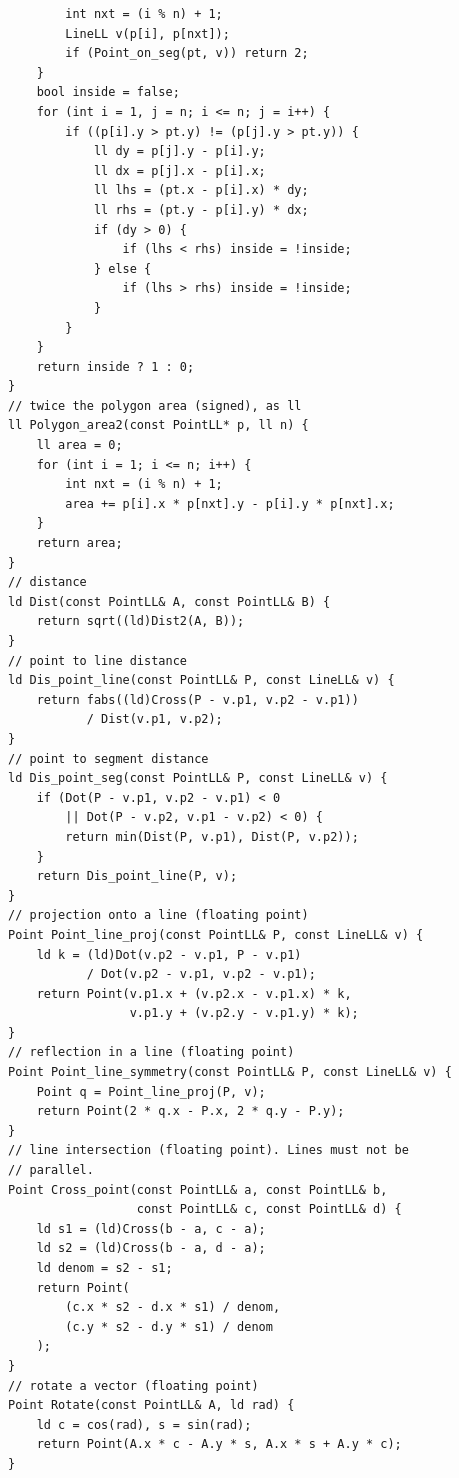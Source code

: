 \begin{lstlisting}
        int nxt = (i % n) + 1;
        LineLL v(p[i], p[nxt]);
        if (Point_on_seg(pt, v)) return 2;
    }
    bool inside = false;
    for (int i = 1, j = n; i <= n; j = i++) {
        if ((p[i].y > pt.y) != (p[j].y > pt.y)) {
            ll dy = p[j].y - p[i].y;
            ll dx = p[j].x - p[i].x;
            ll lhs = (pt.x - p[i].x) * dy;
            ll rhs = (pt.y - p[i].y) * dx;
            if (dy > 0) {
                if (lhs < rhs) inside = !inside;
            } else {
                if (lhs > rhs) inside = !inside;
            }
        }
    }
    return inside ? 1 : 0;
}
// twice the polygon area (signed), as ll
ll Polygon_area2(const PointLL* p, ll n) {
    ll area = 0;
    for (int i = 1; i <= n; i++) {
        int nxt = (i % n) + 1;
        area += p[i].x * p[nxt].y - p[i].y * p[nxt].x;
    }
    return area;
}
// distance
ld Dist(const PointLL& A, const PointLL& B) {
    return sqrt((ld)Dist2(A, B));
}
// point to line distance
ld Dis_point_line(const PointLL& P, const LineLL& v) {
    return fabs((ld)Cross(P - v.p1, v.p2 - v.p1))
           / Dist(v.p1, v.p2);
}
// point to segment distance
ld Dis_point_seg(const PointLL& P, const LineLL& v) {
    if (Dot(P - v.p1, v.p2 - v.p1) < 0
        || Dot(P - v.p2, v.p1 - v.p2) < 0) {
        return min(Dist(P, v.p1), Dist(P, v.p2));
    }
    return Dis_point_line(P, v);
}
// projection onto a line (floating point)
Point Point_line_proj(const PointLL& P, const LineLL& v) {
    ld k = (ld)Dot(v.p2 - v.p1, P - v.p1)
           / Dot(v.p2 - v.p1, v.p2 - v.p1);
    return Point(v.p1.x + (v.p2.x - v.p1.x) * k,
                 v.p1.y + (v.p2.y - v.p1.y) * k);
}
// reflection in a line (floating point)
Point Point_line_symmetry(const PointLL& P, const LineLL& v) {
    Point q = Point_line_proj(P, v);
    return Point(2 * q.x - P.x, 2 * q.y - P.y);
}
// line intersection (floating point). Lines must not be
// parallel.
Point Cross_point(const PointLL& a, const PointLL& b,
                  const PointLL& c, const PointLL& d) {
    ld s1 = (ld)Cross(b - a, c - a);
    ld s2 = (ld)Cross(b - a, d - a);
    ld denom = s2 - s1;
    return Point(
        (c.x * s2 - d.x * s1) / denom,
        (c.y * s2 - d.y * s1) / denom
    );
}
// rotate a vector (floating point)
Point Rotate(const PointLL& A, ld rad) {
    ld c = cos(rad), s = sin(rad);
    return Point(A.x * c - A.y * s, A.x * s + A.y * c);
}
\end{lstlisting}



